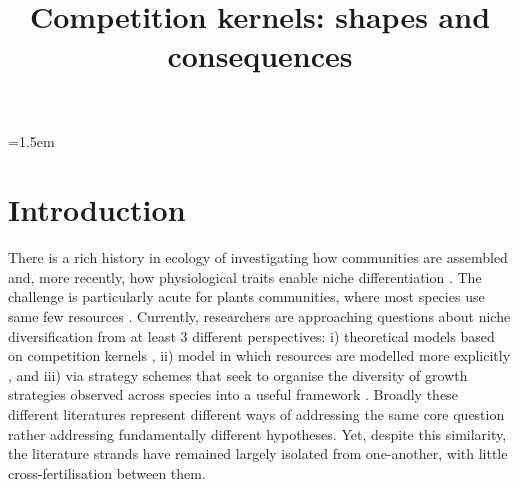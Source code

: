 \documentclass[a4paper,11pt]{article}
\title{Competition kernels: shapes and consequences}
\author{}
\date{}
\affiliation{}
\begin{document}

\parindent=1.5em
\addtolength{\parskip}{.3em}


\section{Introduction}

There is a rich history in ecology of investigating how communities are assembled
and, more recently, how physiological traits enable niche differentiation
\cite[e.g.][]{Gause-1934,MacArthur-1967,Leimar-2013}.
%
The challenge is particularly acute for plants communities,
where most species use same few resources \citep{Whittaker-1970,Grime-1979,
Hubbell-2001, Westoby-2002}.
%
Currently, researchers are approaching questions about niche diversification
from at least 3 different perspectives: 
i) theoretical models based on competition kernels 
\cite[e.g.][]{MacArthur-1967,Case-1982,Dieckmann-1999,Leimar-2013},
ii) model in which resources are modelled more explicitly 
\citep[e.g.][]{Tilman-1977,Huston-1987, Kohyama-1993, Falster-2011},
and  iii) via strategy schemes that seek to organise the diversity of
growth strategies observed across species into a useful framework 
\citep[e.g.][]{Grime-1979,Weiher-1999,Westoby-2002}. 
Broadly these different literatures represent different ways of addressing 
the same core question rather addressing fundamentally different hypotheses. 
Yet, despite this similarity, the literature strands have remained largely isolated
from one-another, with little cross-fertilisation between them. 
\end{document}
